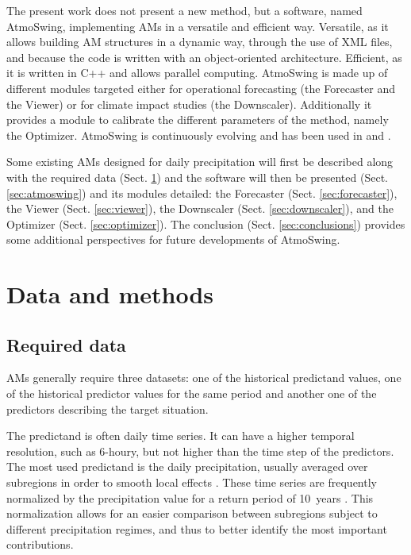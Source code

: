 \documentclass[review]{elsarticle}
\begin{document}
The present work does not present a new method, but a software, named AtmoSwing, implementing AMs in a versatile and efficient way. Versatile, as it allows building AM structures in a dynamic way, through the use of XML files, and because the code is written with an object-oriented architecture. Efficient, as it is written in C++ and allows parallel computing. AtmoSwing is made up of different modules targeted either for operational forecasting (the Forecaster and the Viewer) or for climate impact studies (the Downscaler). Additionally it provides a module to calibrate the different parameters of the method, namely the Optimizer. AtmoSwing is continuously evolving and has been used in \citet{Horton2012, Horton2017a, Horton2017b, Horton2018a} and \citet{Horton2018b}.

Some existing AMs designed for daily precipitation will first be described along with the required data (Sect. \ref{sec:data_methods}) and the software will then be presented (Sect. \ref{sec:atmoswing}) and its modules detailed: the Forecaster (Sect. \ref{sec:forecaster}), the Viewer (Sect. \ref{sec:viewer}), the Downscaler (Sect. \ref{sec:downscaler}), and the Optimizer (Sect. \ref{sec:optimizer}). The conclusion (Sect. \ref{sec:conclusions}) provides some additional perspectives for future developments of AtmoSwing. 


\section{Data and methods}
\label{sec:data_methods}


\subsection{Required data}
\label{sec:data}

AMs generally require three datasets: one of the historical predictand values, one of the historical predictor values for the same period and another one of the predictors describing the target situation.

The predictand is often daily time series. It can have a higher temporal resolution, such as 6-houry, but not higher than the time step of the predictors. The most used predictand is the daily precipitation, usually averaged over subregions in order to smooth local effects \citep{Obled2002, Marty2012}. These time series are frequently normalized by the precipitation value for a return period of 10~years \citep{Djerboua2001}. This normalization allows for an easier comparison between subregions subject to different precipitation regimes, and thus to better identify the most important contributions.
\end{document}
